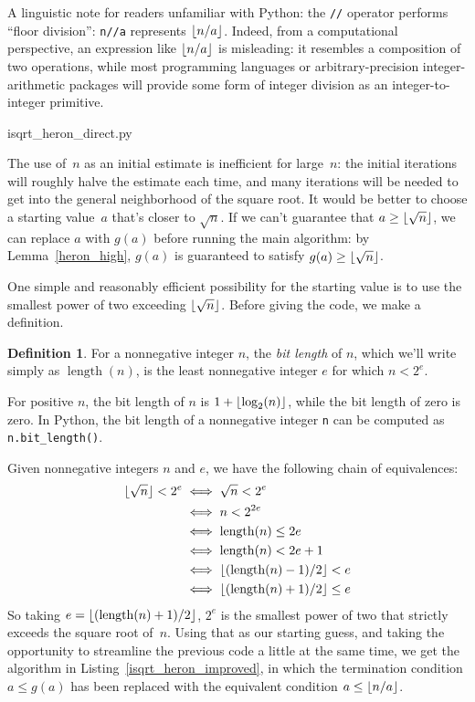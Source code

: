 \documentclass[a4paper]{article}
\DeclarePairedDelimiter\floor{\lfloor}{\rfloor}
\DeclareMathOperator{\length}{length}
\theoremstyle{plain}
\theoremstyle{definition}
\newtheorem{definition}[theorem]{Definition}
\begin{document}
A linguistic note for readers unfamiliar with Python: the \lstinline$//$
operator performs ``floor division'': \lstinline$n//a$ represents $\floor{n /
a}$. Indeed, from a computational perspective, an expression like $\floor{n /
a}$ is misleading: it resembles a composition of two operations, while most
programming languages or arbitrary-precision integer-arithmetic packages will
provide some form of integer division as an integer-to-integer primitive.


  {isqrt_heron_direct.py}

The use of~$n$ as an initial estimate is inefficient for large~$n$: the initial
iterations will roughly halve the estimate each time, and many iterations will
be needed to get into the general neighborhood of the square root. It would be
better to choose a starting value~$a$ that's closer to $\sqrt n$. If we can't
guarantee that $a\ge \floor{\sqrt n}$, we can replace $a$ with $g(a)$ before
running the main algorithm: by Lemma~\ref{heron_high}, $g(a)$ is guaranteed to
satisfy $g(a) \ge \floor{\sqrt n}$.

One simple and reasonably efficient possibility for the starting value is to
use the smallest power of two exceeding $\floor{\sqrt n}$. Before giving the
code, we make a definition.

\begin{definition}
  For a nonnegative integer $n$, the \emph{bit length} of $n$, which we'll
  write simply as $\length(n)$, is the least nonnegative integer $e$ for which
  $n < 2^e$.
\end{definition}

For positive $n$, the bit length of $n$ is $1 + \floor{\log_2(n)}$, while the
bit length of zero is zero. In Python, the bit length of a nonnegative integer
\lstinline$n$ can be computed as \lstinline$n.bit_length()$.

Given nonnegative integers $n$ and $e$, we have the following chain
of equivalences:
\begin{align*}
  \floor{\sqrt n} < 2^e
    &\iff \sqrt n < 2^e \\
    &\iff n < 2^{2e} \\
    &\iff \length(n) \le 2e \\
    &\iff \length(n) < 2e + 1 \\
    &\iff \floor{(\length(n) - 1) / 2} < e \\
    &\iff \floor{(\length(n) + 1) / 2} \le e
\end{align*}
So taking $e = \floor{(\length(n) + 1) / 2}$, $2^e$ is the smallest power of
two that strictly exceeds the square root of~$n$. Using that as our starting
guess, and taking the opportunity to streamline the previous code a little at
the same time, we get the algorithm in Listing~\ref{isqrt_heron_improved}, in
which the termination condition $a \le g(a)$ has been replaced with the
equivalent condition $a \le \floor{n/a}$.
\end{document}
